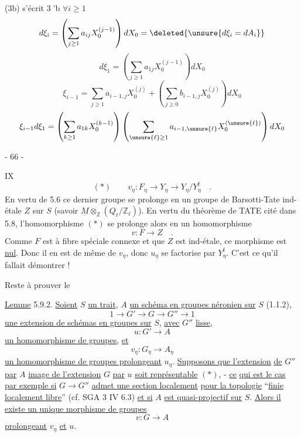 (3b) s'écrit
\textcircled{3'b}
$\forall i\geq1$
\[
 d\xi_i=\left(\sum_{j\geq1}a_{ij}X_0^{(j-1)}\right)dX_0
 =\deleted{\unsure{d\xi_i=dA_i}}
\]
\[
 d\xi_1=\left(\sum_{j\geq1}a_{1j}X_0^{(j-1)}\right)dX_0
\]
\[
 \xi_{i-1}=\sum_{j\geq1}a_{i-1,j}X_0^{(j)}
 +\left(\sum_{j\geq0}b_{i-1,j}X_0^{(j)}\right)dX_0
\]
\[
 \xi_{i-1}d\xi_1=
 \left(\sum_{k\geq1}a_{1k}X_0^{(k-1)}\right)
 \left(\sum_{\unsure{\ell}\geq1}a_{i-1,\unsure{\ell}}X_0^{(\unsure{\ell})}\right)dX_0
\]
\begin{center}- 66 -\end{center}
\hfill IX
\[
(*)\qquad v_\eta:F_\eta\longrightarrow Y_\eta\longrightarrow Y_\eta/Y_\eta^{\mathrm f}\quad .
\]
En vertu de 5.6 ce dernier groupe se prolonge en un groupe de Barsotti-Tate
ind-étale $Z$ sur $S$ (savoir $\underline M\otimes_{\mathbb Z}(Q_\ell/\mathbb Z_\ell)$). En vertu du théorème de TATE
cité dans 5.8, l'homomorphisme $(*)$ se prolonge alors en un homomorphisme
\[
v:F\longrightarrow Z\quad .
\]
Comme $F$ est à fibre spéciale connexe et que $Z$ est ind-étale, ce morphisme
est \uline{nul}. Donc il en est de même de $v_\eta$, donc $u_\eta$ se factorise par $Y_\eta^{\mathrm f}$.
C'est ce qu'il fallait démontrer !

Reste à prouver le

\uline{Lemme} 5.9.2. \uline{Soient} $S$ \uline{un trait}, $A$ \uline{un schéma en groupes néronien sur}
$S$ (1.1.2),
\[
1\longrightarrow G'\longrightarrow G\longrightarrow G''\longrightarrow 1
\]
\uline{une extension de schémas en groupes sur} $S$, \uline{avec} $G''$ \uline{lisse},
\[
u:G'\longrightarrow A
\]
\uline{un homomorphisme de groupes}, \uline{et}
\[
v_\eta:G_\eta\longrightarrow A_\eta
\]
\uline{un homomorphisme de groupes prolongeant} $u_\eta$. \uline{Supposons que l'extension}
\uline{de} $G''$ \uline{par} $A$ \uline{image de l'extension} $G$ \uline{par} $u$ \uline{soit représentable} $(*)$, - \uline{ce}
\uline{qui est le cas par exemple si} $G\longrightarrow G''$ \uline{admet une section localement}
\uline{pour la topologie} ``\uline{finie localement libre}'' (cf. SGA 3 IV 6.3) \uline{et si} $A$
\uline{est quasi-projectif sur} $S$. \uline{Alors il existe un unique morphisme de groupes}
\[
v:G\longrightarrow A
\]
\uline{prolongeant} $v_\eta$ \uline{et} $u$.

